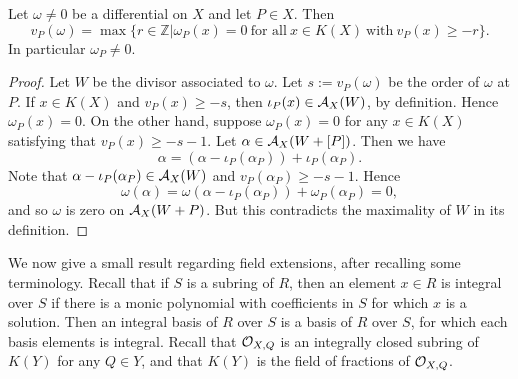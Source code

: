     \begin{prop}\label{propertyofomega}
    Let $\omega \neq 0$ be a differential on $X$ and let $P\in X$. Then
        \[
        v_P(\omega) = \max \{r\in \mathbb{Z}|\omega_P(x) = 0\ \text{for all} \ x\in K(X) \ \text{with}\ v_P(x) \geq -r\}.
        \]
    In particular $\omega_P \neq 0$.
    \end{prop}
    \begin{proof}
    Let $W$ be the divisor associated to $\omega$.
    Let $s:=v_P(\omega)$ be the order of $\omega$ at $P$.
    If $x\in K(X)$ and $v_P(x)\geq -s$, then $\iota_P(x) \in {\mathcal A}_X(W)$, by definition.
    Hence $\omega_P(x) = 0$.
    On the other hand, suppose $\omega_P(x) = 0$ for any $x\in K(X)$ satisfying that $v_P(x) \geq -s-1$.
    Let $\alpha\in {\mathcal A}_X(W+[P])$.
    Then we have
        \[
        \alpha = (\alpha-\iota_P(\alpha_P)) + \iota_P(\alpha_P).
        \]
    Note that $\alpha - \iota_P(\alpha_P)\in {\mathcal A}_X(W)$ and $v_P(\alpha_P) \geq -s-1$.
    Hence
        \[
        \omega(\alpha) = \omega(\alpha-\iota_P(\alpha_P))  + \omega_P(\alpha_P) = 0,
        \]
    and so $\omega$ is zero on ${\mathcal A}_X(W+P)$.
    But this contradicts the maximality of $W$ in its definition.
    
    \end{proof}



We now give a small result regarding field extensions, after recalling some terminology.
Recall that if $S$ is a subring of $R$, then an element $x\in R$ is integral over $S$ if there is a monic polynomial with coefficients in $S$ for which $x$ is a solution.
Then an integral basis of $R$ over $S$ is a basis of $R$ over $S$, for which each basis elements is integral.
Recall that ${\cal O}_{X,Q}$ is an integrally closed subring of $K(Y)$ for any $Q\in Y$, and that $K(Y)$ is the field of fractions of ${\cal O}_{X,Q}$.


